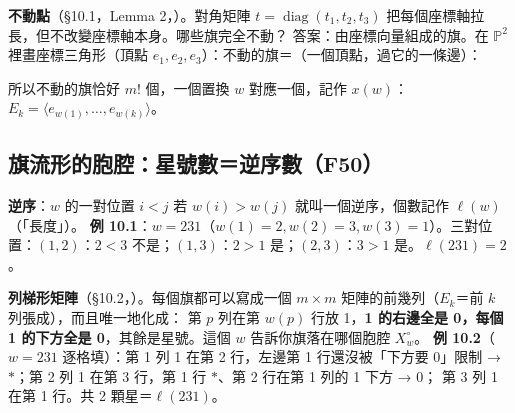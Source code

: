 \textbf{不動點}（\S10.1，Lemma 2，）。對角矩陣 $t=\operatorname{diag}(t_1,t_2,t_3)$ 把每個座標軸拉長，但不改變座標軸本身。哪些旗完全不動？
答案：由座標向量組成的旗。在 $\mathbb P^2$ 裡畫座標三角形（頂點 $e_1,e_2,e_3$）：不動的旗＝（一個頂點，過它的一條邊）：
\begin{center}
\end{center}
所以不動的旗恰好 $m!$ 個，一個置換 $w$ 對應一個，記作 $x(w)$：$E_k=\langle e_{w(1)},\dots,e_{w(k)}\rangle$。

\subsection{旗流形的胞腔：星號數＝逆序數（F50）}\label{sec:f-flagcells}

\textbf{逆序}：$w$ 的一對位置 $i<j$ 若 $w(i)>w(j)$ 就叫一個逆序，個數記作 $\ell(w)$（「長度」）。
\textbf{例 10.1}：$w=231$（$w(1)=2,w(2)=3,w(3)=1$）。三對位置：$(1,2)$：$2<3$ 不是；$(1,3)$：$2>1$ 是；$(2,3)$：$3>1$ 是。$\ell(231)=2$。

\textbf{列梯形矩陣}（\S10.2，）。每個旗都可以寫成一個 $m\times m$ 矩陣的前幾列（$E_k$＝前 $k$ 列張成），而且唯一地化成：
第 $p$ 列在第 $w(p)$ 行放 1，\textbf{1 的右邊全是 0，每個 1 的下方全是 0}，其餘是星號。這個 $w$ 告訴你旗落在哪個胞腔 $X^\circ_w$。
\textbf{例 10.2}（$w=231$ 逐格填）：第 1 列 1 在第 2 行，左邊第 1 行還沒被「下方要 0」限制 → $\ast$；第 2 列 1 在第 3 行，第 1 行 $\ast$、第 2 行在第 1 列的 1 下方 → 0；
第 3 列 1 在第 1 行。共 2 顆星＝$\ell(231)$。

\begin{table}[H]
\centering
\FulFlagCells
\caption{$Fl(3)$ 的六個胞腔（程式產生）。$X^\circ_w\cong\mathbb C^{\ell(w)}$；星號全填 0 就是不動點 $x(w)$。}
\label{tab:f-flagcells}
\end{table}

